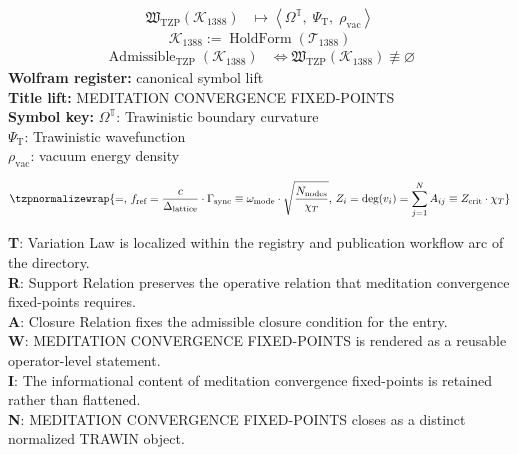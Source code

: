 \noindent
\begin{minipage}[t]{0.48\linewidth}
\begingroup
\small
\[
\begin{aligned}
\mathfrak{W}_{\mathrm{TZP}}\!\left(\mathcal{K}_{1388}\right)
&\longmapsto
\left\langle \Omega^{\mathbb{T}},\; \Psi_{\mathrm{T}},\; \rho_{\mathrm{vac}} \right\rangle
\end{aligned}
\]
\[
\mathcal{K}_{1388}
:=
\operatorname{HoldForm}\!\left(\mathcal{T}_{1388}\right)
\]
\[
\begin{aligned}
\operatorname{Admissible}_{\mathrm{TZP}}\!\left(\mathcal{K}_{1388}\right)
&\Longleftrightarrow
\mathfrak{W}_{\mathrm{TZP}}\!\left(\mathcal{K}_{1388}\right)\not\equiv\varnothing
\end{aligned}
\]
\textbf{Wolfram register:} canonical symbol lift\\
\textbf{Title lift:} MEDITATION CONVERGENCE FIXED-POINTS\\
\textbf{Symbol key:} \(\Omega^{\mathbb{T}}\): Trawinistic boundary curvature\\ \(\Psi_{\mathrm{T}}\): Trawinistic wavefunction\\ \(\rho_{\mathrm{vac}}\): vacuum energy density
\par
\endgroup
\end{minipage}\hfill
\begin{minipage}[t]{0.48\linewidth}
\[
\tzpnormalizewrap{=,\,f_{\text{ref}} = \frac{c}{\Delta_{\text{lattice}}} \cdot \Gamma_{\text{sync}} \equiv \omega_{\text{mode}} \cdot \sqrt{\frac{N_{\text{nodes}}}{\chi_T}},\,Z_i = \text{deg}(v_i) = \sum_{j=1}^{N} A_{ij} \equiv Z_{\text{crit}} \cdot \chi_T}
\]

\small
\textbf{T}: Variation Law is localized within the registry and publication workflow arc of the directory.\\
\textbf{R}: Support Relation preserves the operative relation that meditation convergence fixed-points requires.\\
\textbf{A}: Closure Relation fixes the admissible closure condition for the entry.\\
\textbf{W}: MEDITATION CONVERGENCE FIXED-POINTS is rendered as a reusable operator-level statement.\\
\textbf{I}: The informational content of meditation convergence fixed-points is retained rather than flattened.\\
\textbf{N}: MEDITATION CONVERGENCE FIXED-POINTS closes as a distinct normalized TRAWIN object.
\normalsize
\end{minipage}

